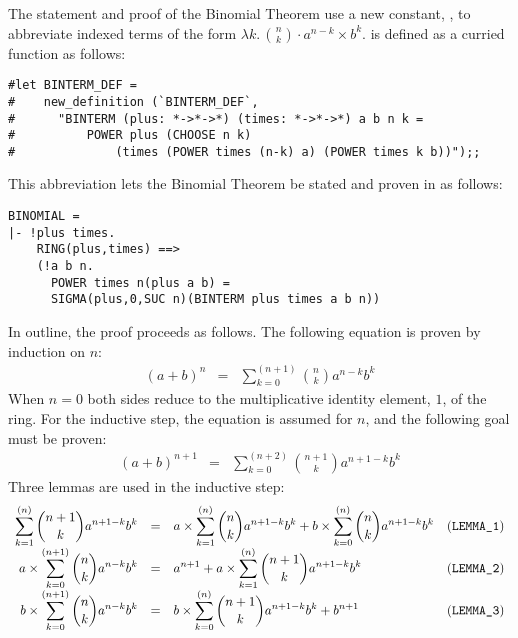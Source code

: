 The statement and proof of the Binomial Theorem use a new \HOL{} constant, 
\verb@BINTERM@, to abbreviate indexed terms of the form $\lambda k.\,{n 
\choose k} \cdot a^{n-k} \times b^k$.  \verb@BINTERM@ is defined as a
curried function as follows:
\begin{session}
\begin{verbatim}
#let BINTERM_DEF =
#    new_definition (`BINTERM_DEF`,
#      "BINTERM (plus: *->*->*) (times: *->*->*) a b n k =
#          POWER plus (CHOOSE n k)
#              (times (POWER times (n-k) a) (POWER times k b))");;
\end{verbatim}
\end{session}
This abbreviation lets the Binomial Theorem be stated and proven in \HOL{} as
follows:
\begin{session}
\begin{verbatim}
BINOMIAL = 
|- !plus times.
    RING(plus,times) ==>
    (!a b n.
      POWER times n(plus a b) =
      SIGMA(plus,0,SUC n)(BINTERM plus times a b n))
\end{verbatim}
\end{session}
In outline, the proof proceeds as follows.  The following equation is
proven by induction on $n$:
\begin{eqnarray*}
(a+b)^n &=& \sum_{k=0}^{(n+1)} {n \choose k} a^{n-k} b^k
\end{eqnarray*}
When $n=0$ both sides reduce to the multiplicative identity element, $1$, 
of the ring. For the inductive step, the equation is assumed for $n$, and 
the following goal must be proven:
\begin{eqnarray*}
(a+b)^{n+1} &=& \sum_{k=0}^{(n+2)} {{n+1} \choose k} a^{n+1-k} b^k
\end{eqnarray*}
Three lemmas are used in the inductive step:
\[\begin{array}{rcll}
\displaystyle
\sum_{k=1}^{(n)} {{n+1} \choose k} a^{n+1-k} b^k &=&
\displaystyle
    a \times \sum_{k=1}^{(n)} {n \choose k} a^{n+1-k} b^k +
    b \times \sum_{k=0}^{(n)} {n \choose k} a^{n+1-k} b^k
    & \mbox{({\tt LEMMA\_1})} \\
\displaystyle
a \times \sum_{k=0}^{(n+1)} {n \choose k} a^{n-k} b^k &=&
\displaystyle
    a^{n+1} +
    a \times \sum_{k=1}^{(n)} {{n+1} \choose k} a^{n+1-k} b^k
    & \mbox{({\tt LEMMA\_2})} \\
\displaystyle
b \times \sum_{k=0}^{(n+1)} {n \choose k} a^{n-k} b^k &=&
\displaystyle
    b \times \sum_{k=0}^{(n)} {{n+1} \choose k} a^{n+1-k} b^k
    + b^{n+1}
    & \mbox{({\tt LEMMA\_3})}
\end{array}\]
